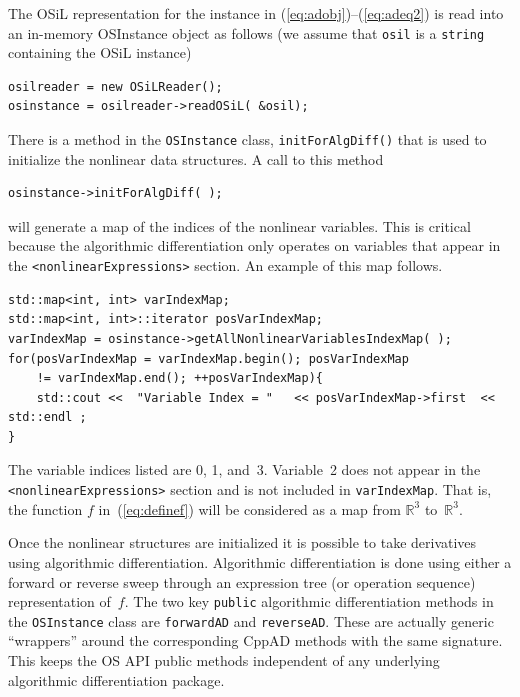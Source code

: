 \documentclass[11pt]{article}
\renewcommand{\_}{{\char"5F}}
\renewcommand{\{}{{\char"7B}}
\renewcommand{\}}{{\char"7D}}
\renewcommand{\^}{{\char"0D}}
\renewcommand{\'}{{\char"0D}}
\begin{document}
\begin{enumerate}[Step 1:]
The OSiL representation for the instance  in  (\ref{eq:adobj})--(\ref{eq:adeq2})  is read into an in-memory
OSInstance object as follows (we assume that {\tt osil} is a {\tt string} containing the OSiL instance)
\begin{verbatim}
osilreader = new OSiLReader();
osinstance = osilreader->readOSiL( &osil);
\end{verbatim}
There is a method in the {\tt OSInstance} class, {\tt initForAlgDiff()} that is used to initialize the nonlinear data structures.  A call to this method
\begin{verbatim}
osinstance->initForAlgDiff( );
\end{verbatim}
will generate a map of the indices of the nonlinear variables. This is critical because the algorithmic 
differentiation only operates on variables that appear in the {\tt <nonlinearExpressions>} section.  
An example of this map follows.
\begin{verbatim}
std::map<int, int> varIndexMap;
std::map<int, int>::iterator posVarIndexMap;
varIndexMap = osinstance->getAllNonlinearVariablesIndexMap( );
for(posVarIndexMap = varIndexMap.begin(); posVarIndexMap
    != varIndexMap.end(); ++posVarIndexMap){
    std::cout <<  "Variable Index = "   << posVarIndexMap->first  << std::endl ;
}
\end{verbatim}
The variable indices listed are 0, 1, and~3. Variable~2 does not appear in the {\tt <nonlinearExpressions>} section and
is not included in {\tt varIndexMap}. That is, the function $f$ in~(\ref{eq:definef}) will be considered as a map from 
$\mathbb{R}^{3}$ to~$\mathbb{R}^{3}$.

Once the nonlinear structures are initialized it is possible to take derivatives using algorithmic differentiation.
Algorithmic differentiation is done using either a forward or reverse sweep through an expression tree (or operation
sequence) representation of~$f$.  The two key {\tt public} algorithmic differentiation  methods in the {\tt OSInstance}%
 class are {\tt forwardAD} and {\tt reverseAD}.
These are actually  generic ``wrappers'' around the corresponding CppAD methods with the same signature.
This keeps the OS API  public methods independent of any underlying algorithmic differentiation package.


\end{enumerate}
\end{document}
